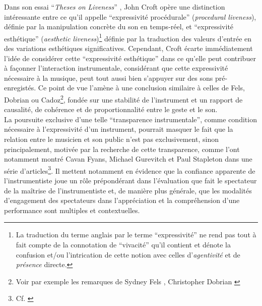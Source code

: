 \indent Dans son essai ``\textit{Theses on Liveness}'' \cite{croft_theses_2007}, John Croft opère une distinction intéressante entre ce qu'il appelle ``expressivité procédurale'' (\textit{procedural liveness}), définie par la manipulation concrète du son en temps-réel, et ``expressivité esthétique'' (\textit{aesthetic liveness})\footnote{La traduction du terme anglais  par le terme ``expressivité'' ne rend pas tout à fait compte de la connotation de ``vivacité'' qu'il contient et dénote la confusion et/ou l'intrication de cette notion avec celles d'\textit{agentivité} et de \textit{présence} directe.} définie par la traduction des valeurs d'entrée en des variations esthétiques significatives. Cependant, Croft écarte immédiatement l'idée de considérer cette ``expressivité esthétique'' dans ce qu'elle peut contribuer à façonner l'interaction instrumentale, considérant que cette expressivité nécessaire à la musique, peut tout aussi bien s'appuyer sur des sons pré-enregistés. Ce point de vue l'amène à une conclusion similaire à celles de Fels, Dobrian ou Cadoz\footnote{Voir par exemple les remarques de Sydney Fels \cite{fels_mapping_2002} , Christopher Dobrian \cite{dobrian_e_2006} }, fondée sur une stabilité de l'instrument et un rapport de causalité, de cohérence et de proportionnalité entre le geste et le son.\\
\indent La poursuite exclusive d'une telle ``transparence instrumentale'', comme condition nécessaire à l'expressivité d'un instrument, pourrait masquer le fait que la relation entre le musicien et son public n'est pas exclusivement, sinon principalement, motivée par la recherche de cette transparence, comme l'ont notamment montré Cavan Fyans, Michael Gurevitch et Paul Stapleton dans une série d'articles\footnote{Cf. \cite{fyans_where_2009, fyans_examining_2010, gurevich_digital_2011}}. Il mettent notamment en évidence que la confiance apparente de l'instrumentiste joue un rôle prépondérant dans l'évaluation que fait le spectateur de la maîtrise de l'instrumentiste et, de manière plus générale, que les modalités d'engagement des spectateurs dans l'appréciation et la compréhension d'une performance sont multiples et contextuelles.\\

